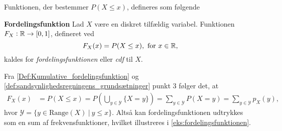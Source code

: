 





Funktionen, der bestemmer $P(X \leq x)$, defineres som følgende


\begin{minipage}\textwidth
\begin{defn}\textbf{Fordelingsfunktion}\label{Def:Kumulative_fordelingsfunktion} %
\newline
Lad $X$ være en diskret tilfældig variabel. Funktionen $F_X:\mathbb{R} \to [0,1]$, defineret ved
$$F_X(x)=P(X\leq x), \text{ for } x\in\mathbb{R},$$
kaldes for \textit{fordelingsfunktionen} eller \textit{cdf} til $X$.
\end{defn}
\end{minipage}

Fra \autoref{Def:Kumulative_fordelingsfunktion} og \autoref{def:sandsynlighedsregningens_grundsætninger} punkt 3 følger det, at
%
\begin{align}
    F_X(x) &= P\left(X\leq x\right)=P\left(\bigcup_{y\in \mathcal{Y}} \{X=y\}\right) = \sum_{y\in \mathcal{Y}} P(X=y) = \sum_{y\in \mathcal{Y}} p_X(y), \label{eq:fordelingsfunktion_som_sum_af_frekvensfunktioner}
\end{align}
hvor $\mathcal{Y} = \{y\in \text{Range}(X) \ | \ y\leq x\}$.
%
Altså kan fordelingsfunktionen udtrykkes som en sum af frekvensfunktioner, hvilket illustreres i \autoref{eks:fordelingsfunktionen}.


